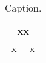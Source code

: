 \begin{table}[htbp]
\centering
\begin{tabular}{cc}
\hline
\multicolumn{2}{c}{\multirow{2}{*}{\textbf{xx}}} \\
\multicolumn{2}{c}{}                             \\ \hline
x                       & x                      \\ \hline
\end{tabular}
\label{tab:tb_K_M}
\caption{Caption.}
\end{table}